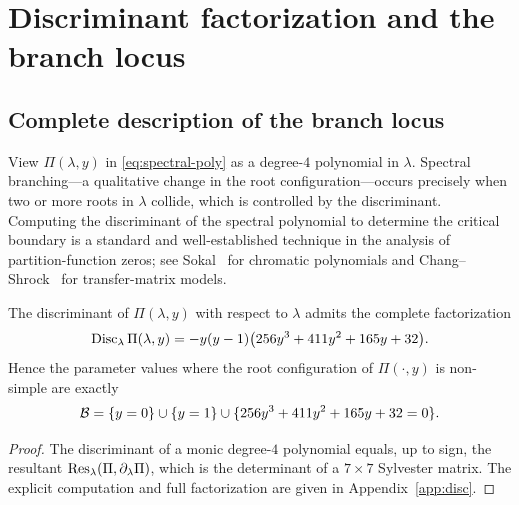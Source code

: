 \section{Discriminant factorization and the branch locus}\label{sec:disc}

\subsection{Complete description of the branch locus}

View $\Pi(\lambda,y)$ in \eqref{eq:spectral-poly} as a degree-$4$ polynomial in $\lambda$.
Spectral branching---a qualitative change in the root configuration---occurs precisely when two or more roots in $\lambda$ collide, which is controlled by the discriminant.
Computing the discriminant of the spectral polynomial to determine the critical boundary is a standard and well-established technique in the analysis of partition-function zeros; see Sokal~\cite{Sokal2001} for chromatic polynomials and Chang--Shrock~\cite{ChangShrock2001} for transfer-matrix models.

\begin{theorem}\label{thm:disc-factor}
The discriminant of $\Pi(\lambda,y)$ with respect to $\lambda$ admits the complete factorization
\begin{equation}\label{eq:disc-factor}
\operatorname{Disc}_{\lambda}\Pi(\lambda,y)=-y(y-1)\bigl(256y^3+411y^2+165y+32\bigr).
\end{equation}
Hence the parameter values where the root configuration of $\Pi(\cdot,y)$ is non-simple are exactly
\[
\mathcal{B}=\{y=0\}\cup\{y=1\}\cup\{256y^3+411y^2+165y+32=0\}.
\]
\end{theorem}

\begin{proof}
The discriminant of a monic degree-$4$ polynomial equals, up to sign, the resultant $\operatorname{Res}_{\lambda}(\Pi,\partial_\lambda\Pi)$, which is the determinant of a $7\times 7$ Sylvester matrix.
The explicit computation and full factorization are given in Appendix~\ref{app:disc}.
\end{proof}

